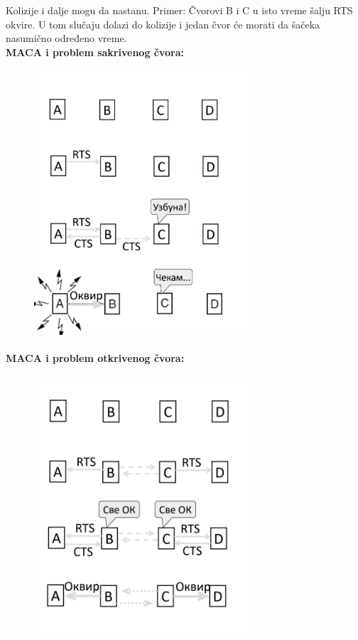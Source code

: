\documentclass[a4paper]{article}
\begin{document}
        Kolizije i dalje mogu da nastanu. Primer: Čvorovi B i C u isto vreme šalju RTS okvire. 
        U tom slučaju dolazi do kolizije i jedan čvor će morati da šačeka nasumično određeno vreme.\\

        \newpage
        \noindent \textbf{MACA i problem sakrivenog čvora:}
        \begin{figure}[H]
            \begin{center}
                \includegraphics[width=80mm,height=100mm]{Slike/maca_skriveni_cvor.png}
            \end{center}
        \end{figure}

        \newpage
        \noindent \textbf{MACA i problem otkrivenog čvora:}
        \begin{figure}[H]
            \begin{center}
                \includegraphics[width=80mm,height=100mm]{Slike/maca_otkriveni_cvor.png}
            \end{center}
        \end{figure}
   
\end{document}
